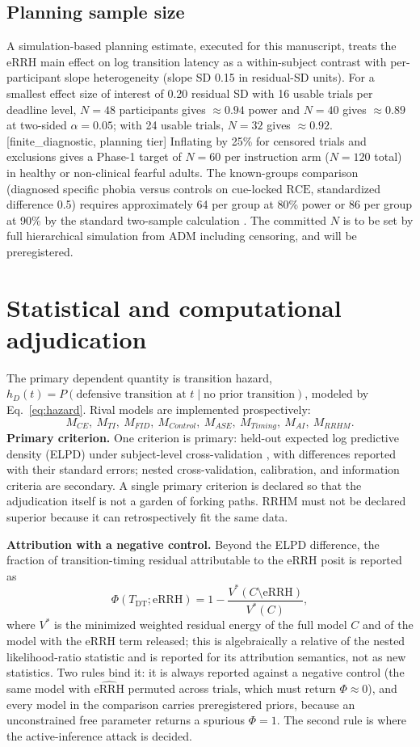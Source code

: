 \documentclass[9pt,twocolumn]{article}
\newcommand{\eRRH}{\mathrm{eRRH}}
\newcommand{\eRRHhat}{\widehat{\mathrm{eRRH}}}
\newcommand{\RCE}{\mathrm{RCE}}
\newcommand{\Tdt}{T_{\mathrm{DT}}}
\newcommand{\tier}[1]{{\sffamily\scriptsize\color{RRHMSlate}[#1]}}
\begin{document}
\subsection{Planning sample size}
A simulation-based planning estimate, executed for this manuscript, treats the eRRH main effect on log transition latency as a within-subject contrast with per-participant slope heterogeneity (slope SD 0.15 in residual-SD units). For a smallest effect size of interest of 0.20 residual SD with 16 usable trials per deadline level, $N=48$ participants gives $\approx0.94$ power and $N=40$ gives $\approx0.89$ at two-sided $\alpha=0.05$; with 24 usable trials, $N=32$ gives $\approx0.92$. \tier{finite\_diagnostic, planning tier} Inflating by 25\% for censored trials and exclusions gives a Phase-1 target of $N=60$ per instruction arm ($N=120$ total) in healthy or non-clinical fearful adults. The known-groups comparison (diagnosed specific phobia versus controls on cue-locked $\RCE$, standardized difference 0.5) requires approximately 64 per group at 80\% power or 86 per group at 90\% by the standard two-sample calculation \cite{cohen1988}. The committed $N$ is to be set by full hierarchical simulation from ADM including censoring, and will be preregistered.

\section{Statistical and computational adjudication}
\label{sec:stats}
The primary dependent quantity is transition hazard, $h_D(t)=P(\text{defensive transition at }t\mid\text{no prior transition})$, modeled by Eq.~\ref{eq:hazard}. Rival models are implemented prospectively:
\[
M_{CE},\ M_{TI},\ M_{FID},\ M_{Control},\ M_{ASE},\ M_{Timing},\ M_{AI},\ M_{RRHM}.
\]
\textbf{Primary criterion.} One criterion is primary: held-out expected log predictive density (ELPD) under subject-level cross-validation \cite{vehtari2017}, with differences reported with their standard errors; nested cross-validation, calibration, and information criteria are secondary. A single primary criterion is declared so that the adjudication itself is not a garden of forking paths. RRHM must not be declared superior because it can retrospectively fit the same data.

\textbf{Attribution with a negative control.} Beyond the ELPD difference, the fraction of transition-timing residual attributable to the eRRH posit is reported as
\[
\Phi(\Tdt;\eRRH)=1-\frac{V^{*}(C\setminus\eRRH)}{V^{*}(C)},
\]
where $V^{*}$ is the minimized weighted residual energy of the full model $C$ and of the model with the eRRH term released; this is algebraically a relative of the nested likelihood-ratio statistic and is reported for its attribution semantics, not as new statistics. Two rules bind it: it is always reported against a negative control (the same model with $\eRRHhat$ permuted across trials, which must return $\Phi\approx0$), and every model in the comparison carries preregistered priors, because an unconstrained free parameter returns a spurious $\Phi=1$. The second rule is where the active-inference attack is decided.
\end{document}
